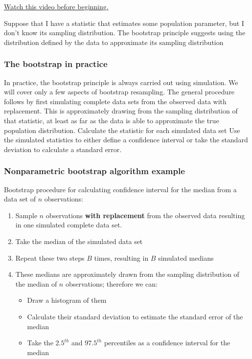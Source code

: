 \documentclass[]{article}
\begin{document}
\href{http://youtu.be/BKrMjX7FBno?list=PLpl-gQkQivXiBmGyzLrUjzsblmQsLtkzJ}{Watch
this video before beginning.}

Suppose that I have a statistic that estimates some population
parameter, but I don't know its sampling distribution. The bootstrap
principle suggests using the distribution defined by the data to
approximate its sampling distribution

\subsubsection{The bootstrap in
practice}\label{the-bootstrap-in-practice}

In practice, the bootstrap principle is always carried out using
simulation. We will cover only a few aspects of bootstrap resampling.
The general procedure follows by first simulating complete data sets
from the observed data with replacement. This is approximately drawing
from the sampling distribution of that statistic, at least as far as the
data is able to approximate the true population distribution. Calculate
the statistic for each simulated data set Use the simulated statistics
to either define a confidence interval or take the standard deviation to
calculate a standard error.

\subsubsection{Nonparametric bootstrap algorithm
example}\label{nonparametric-bootstrap-algorithm-example}

Bootstrap procedure for calculating confidence interval for the median
from a data set of $n$ observations:

\begin{enumerate}
\def\labelenumi{\arabic{enumi}.}
\item
  Sample $n$ observations \textbf{with replacement} from the observed
  data resulting in one simulated complete data set.
\item
  Take the median of the simulated data set
\item
  Repeat these two steps $B$ times, resulting in $B$ simulated medians
\item
  These medians are approximately drawn from the sampling distribution
  of the median of $n$ observations; therefore we can:

  \begin{itemize}
  \itemsep1pt\parskip0pt
  \item
    Draw a histogram of them
  \item
    Calculate their standard deviation to estimate the standard error of
    the median
  \item
    Take the $2.5^{th}$ and $97.5^{th}$ percentiles as a confidence
    interval for the median
  \end{itemize}
\end{enumerate}
\end{document}
